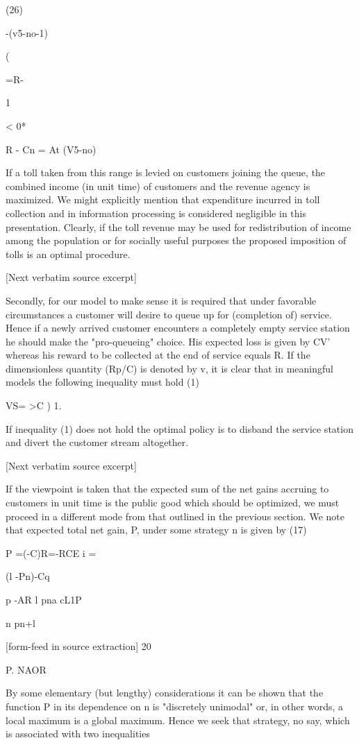 \documentclass[10pt]{article}
\begin{document}
\begin{ReviewVerbatim}
(26)

-(v5-no-1)

(

=R-

1

< 0*

R - Cn = At (V5-no)

If a toll taken from this range is levied on customers joining the queue, the combined income (in unit time) of customers and the revenue agency is maximized.
We might explicitly mention that expenditure incurred in toll collection and in
information processing is considered negligible in this presentation.
Clearly, if the toll revenue may be used for redistribution of income among the
population or for socially useful purposes the proposed imposition of tolls is an
optimal procedure.

[Next verbatim source excerpt]

Secondly, for our model to make sense it is required that under favorable circumstances a customer will desire to queue up for (completion of) service. Hence if a
newly arrived customer encounters a completely empty service station he should
make the "pro-queueing" choice. His expected loss is given by CV' whereas his
reward to be collected at the end of service equals R. If the dimensionless quantity
(Rp/C) is denoted by v, it is clear that in meaningful models the following inequality
must hold
(1)

VS= >C ) 1.

If inequality (1) does not hold the optimal policy is to disband the service station
and divert the customer stream altogether.

[Next verbatim source excerpt]

If the viewpoint is taken that the expected sum of the net gains accruing to
customers in unit time is the public good which should be optimized, we must
proceed in a different mode from that outlined in the previous section. We note
that expected total net gain, P, under some strategy n is given by
(17)

P =(-C)R=-RCE {i} =

(l -Pn)-Cq

p
-AR l
pna cL1P

n pn+l


[form-feed in source extraction]
20

P. NAOR

By some elementary (but lengthy) considerations it can be shown that the
function P in its dependence on n is "discretely unimodal" or, in other words, a
local maximum is a global maximum. Hence we seek that strategy, no say, which is
associated with two inequalities


\end{ReviewVerbatim}
\end{document}
